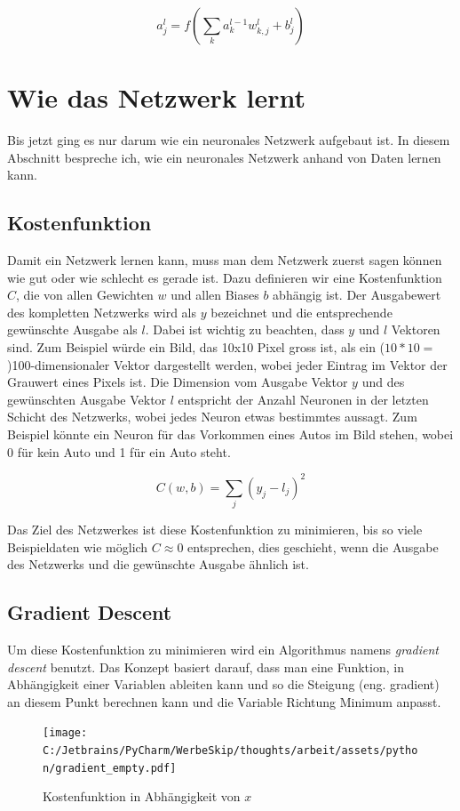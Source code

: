 \documentclass[12pt,a4paper]{report}
\begin{document}
\[a^l_j = f\left(\sum_{k} a^{l-1}_k w^l_{k,j} + b^l_j\right)\]

\section{Wie das Netzwerk lernt}\label{sec:lernen}
Bis jetzt ging es nur darum wie ein neuronales Netzwerk aufgebaut ist.
In diesem Abschnitt bespreche ich, wie ein neuronales Netzwerk anhand von Daten lernen kann.
\subsection{Kostenfunktion}
Damit ein Netzwerk lernen kann, muss man dem Netzwerk zuerst sagen können wie gut oder wie schlecht es gerade ist.
Dazu definieren wir eine Kostenfunktion $C$, die von allen Gewichten $w$ und allen Biases $b$ abhängig ist.
Der Ausgabewert des kompletten Netzwerks wird als $y$ bezeichnet und die entsprechende gewünschte Ausgabe als $l$.
Dabei ist wichtig zu beachten, dass $y$ und $l$ Vektoren sind.
Zum Beispiel würde ein Bild, das 10x10 Pixel gross ist, als ein ($10 * 10 =$)100-dimensionaler Vektor dargestellt werden,
wobei jeder Eintrag im Vektor der Grauwert eines Pixels ist.
Die Dimension vom Ausgabe Vektor $y$ und des gewünschten Ausgabe Vektor $l$ entspricht der Anzahl Neuronen in der letzten Schicht des Netzwerks,
wobei jedes Neuron etwas bestimmtes aussagt.
Zum Beispiel könnte ein Neuron für das Vorkommen eines Autos im Bild stehen, wobei 0 für kein Auto und 1 für ein Auto steht.

\[C(w,b) = \sum_{j}(y_j - l_j)^2\]

Das Ziel des Netzwerkes ist diese Kostenfunktion zu minimieren, bis so viele Beispieldaten wie möglich $C \approx 0$ entsprechen,
dies geschieht, wenn die Ausgabe des Netzwerks und die gewünschte Ausgabe ähnlich ist.
\subsection{Gradient Descent}
Um diese Kostenfunktion zu minimieren wird ein Algorithmus namens \textit{gradient descent} benutzt.
Das Konzept basiert darauf, dass man eine Funktion, in Abhängigkeit einer Variablen ableiten kann und so die Steigung (eng. gradient)
an diesem Punkt berechnen kann und die Variable Richtung Minimum anpasst.

\begin{figure}[h]%
    \centering
    \texttt{[image: C:/Jetbrains/PyCharm/WerbeSkip/thoughts/arbeit/assets/python/gradient\_empty.pdf]} %
    \caption{Kostenfunktion in Abhängigkeit von $x$}%
    \label{fig:grad1}%
\end{figure}
\end{document}

